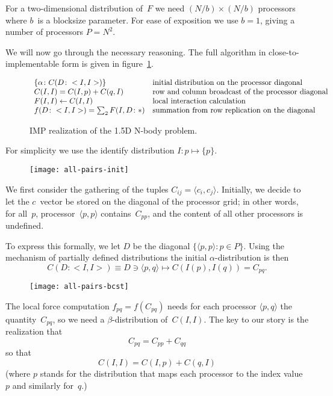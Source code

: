 For a two-dimensional distribution of~$F$ we need $(N/b)\times (N/b)$ processors
where $b$~is a blocksize parameter. For ease of exposition we use $b=1$,
giving a number of processors $P=N^2$.

We will now go through the necessary reasoning. The full algorithm in
close-to-implementable form is given in figure~\ref{fig:nbody-1.5d}.
\begin{figure}[t]
  \begin{equation}
    \begin{array}{ll}
      \{\alpha\colon C( D\colon <I,I>) \}&\hbox{initial distribution on the processor diagonal}\\
      C(I,I) = C(I,p)+C(q,I)&\hbox{row and column broadcast of the processor diagonal}\\
      F(I,I)\leftarrow C(I,I)&\hbox{local interaction calculation}\\
      f(D\colon<I,I>)=\sum_2 F(I,D\colon *)&\hbox{summation from row replication on the diagonal}
    \end{array}
    \label{eq:nbody-1.5d}
  \end{equation}
  \caption{IMP realization of the 1.5D N-body problem.}
  \label{fig:nbody-1.5d}
\end{figure}
For simplicity we use the identify distribution $I\colon p\mapsto\{p\}$.


\begin{wrapfigure}{r}{2in}
  \texttt{[image: all-pairs-init]}
\end{wrapfigure}
%
We first consider the gathering of the tuples $C_{ij}=\langle c_i,c_j\rangle$.
Initially, we decide to let the $c$~vector be stored on the diagonal of the processor grid;
in other words,
for all~$p$, processor~$\langle p,p\rangle$ contains~$C_{pp}$,
and the content of all other processors is undefined.

To express this formally, we let $D$ be the diagonal $\{\langle p,p\rangle\colon p\in P\}$.
Using the mechanism of partially defined distributions
the initial $\alpha$-distribution is then
\begin{equation}
C( D\colon <I,I>)\equiv D\ni \langle p,q\rangle\mapsto
C(I(p),I(q))=C_{pq}.
\label{eq:c-alpha}
\end{equation}


\begin{wrapfigure}{r}{2in}
  \texttt{[image: all-pairs-bcst]}
\end{wrapfigure}
%
The local force computation $f_{pq}=f(C_{pq})$ needs for each processor $\langle p,q\rangle$
the quantity~$C_{pq}$, so we need a $\beta$-distribution of~$C(I,I)$.
The key to our story is the realization that 
\[ C_{pq} = C_{pp}+C_{qq} \]
so that
\[ C(I,I) = C(I,p)+C(q,I) \]
(where $p$ stands for the distribution that maps each processor
to the index value~$p$ and similarly for~$q$.)

